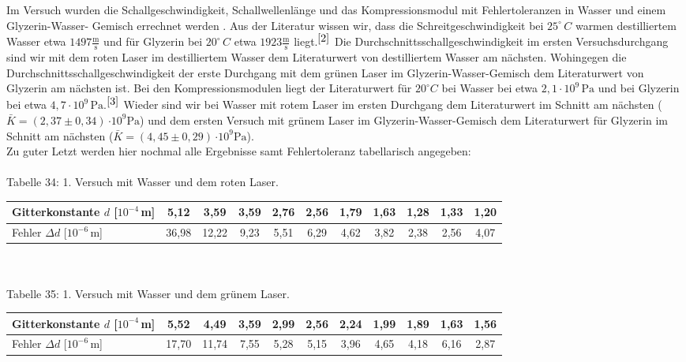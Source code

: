 \documentclass[fontsize=12pt]{scrartcl}
\begin{document}
Im Versuch wurden die Schallgeschwindigkeit, Schallwellenlänge und das Kompressionsmodul mit Fehlertoleranzen in Wasser und einem Glyzerin-Wasser-
Gemisch errechnet werden . Aus der Literatur wissen wir, dass die Schreitgeschwindigkeit bei  $25^{\circ}\,C$ warmen destilliertem Wasser etwa $1497 \frac{{\text{m}}}{{\text{s}}}$ und für Glyzerin bei $20^{\circ}\,C$ etwa $1923 \frac{{\text{m}}}{{\text{s}}}$  liegt.$^{\cite{2}}$
Die Durchschnittsschallgeschwindigkeit im ersten Versuchsdurchgang sind wir mit dem roten Laser im destilliertem Wasser dem Literaturwert von destilliertem Wasser am nächsten. 
Wohingegen die Durchschnittsschallgeschwindigkeit der erste Durchgang mit dem grünen Laser im Glyzerin-Wasser-Gemisch dem Literaturwert von Glyzerin am nächsten ist.
Bei den Kompressionsmodulen liegt der Literaturwert für $20^{\circ}C$ bei Wasser bei etwa $2,1 \cdot 10^9\, \text{Pa}$ und bei Glyzerin bei etwa $4,7 \cdot 10^9\, \text{Pa}$.$^{\cite{3}}$ Wieder sind wir bei Wasser mit rotem Laser im ersten Durchgang dem Literaturwert im Schnitt am nächsten ($\bar{K}=(2,37\pm 0,34)\, \text{$\cdot 10^9$Pa}$) und dem ersten Versuch mit grünem Laser im Glyzerin-Wasser-Gemisch dem Literaturwert für Glyzerin im Schnitt am nächsten ($\bar{K}=(4,45\pm 0,29)\, \text{$\cdot 10^9$Pa}$). \\
\newpage
\noindent
Zu guter Letzt  werden hier nochmal alle Ergebnisse samt Fehlertoleranz tabellarisch angegeben: \\
~\\
Tabelle 34: 1. Versuch mit Wasser und dem roten Laser. \\
\begin{tabular}{|l|c|c|c|c|c|c|c|c|c|c|} \hline
Gitterkonstante $d$ [$10^{-4}$\,m] & 5,12 & 3,59 & 3,59 & 2,76 & 2,56 & 1,79 & 1,63 & 1,28 & 1,33 & 1,20 \\ \hline
Fehler $\Delta d$ [$10^{-6}$\,m] & 36,98 & 12,22 & 9,23 & 5,51 & 6,29 & 4,62 & 3,82 & 2,38 &  2,56 & 4,07  \\ \hline
\end{tabular}\\

~\\
Tabelle 35: 1. Versuch mit Wasser und dem grünem Laser. \\
\begin{tabular}{|l|c|c|c|c|c|c|c|c|c|c|} \hline
Gitterkonstante $d$ [$10^{-4}$\,m] & 5,52 & 4,49 & 3,59 & 2,99 & 2,56 & 2,24 & 1,99 & 1,89 & 1,63 & 1,56 \\ \hline 
Fehler $\Delta d$ [$10^{-6}$\,m]  & 17,70 & 11,74 & 7,55  & 5,28 & 5,15 & 3,96 & 4,65 & 4,18 & 6,16 & 2,87 \\ \hline
\end{tabular} \\
\end{document}
